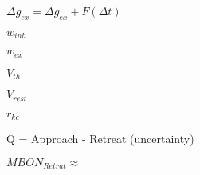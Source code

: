 $\Delta g_{ex} = \Delta g_{ex} + F(\Delta t)$

$w_{inh}$

$w_{ex}$

$V_{th}$

$V_{rest}$

$r_{kc}$

Q = Approach - Retreat (uncertainty)


$MBON_{Retrat} \approx $